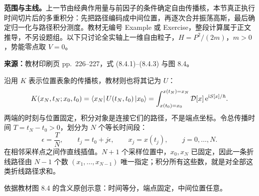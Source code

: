 \textbf{范围与主线。}上一节由经典作用量与前因子的条件确定自由传播核，本节真正执行时间切片后的多重积分：先把路径编码成中间位置，再逐次合并振荡高斯，最后确定归一化与路径积分测度。教材无编号 Example 或 Exercise，整段计算属于正文推导，不另设题组。以下只讨论全实轴上一维自由粒子，$H=P^2/(2m)$，$m>0$，势能零点取 $V=0$。

\textbf{来源：}教材印刷页 pp.~226--227，式 (8.4.1)--(8.4.3) 与图 8.4。

沿用 $K$ 表示位置表象的传播核，教材则也将其记为 $U$：
\begin{equation}
  K(x_N,t_N;x_0,t_0)=\left\langle x_N\right|U(t_N,t_0)\left|x_0\right\rangle
  =\int_{x(t_0)=x_0}^{x(t_N)=x_N}\mathcal D[x]\,
    \mathrm{e}^{\mathrm{i} S[x]/\hbar}.
\end{equation}
两端的时刻与位置固定，积分对象是连接它们的路径，不是端点坐标。令总传播时间 $T=t_N-t_0>0$，划分为 $N$ 个等长时间段：
\begin{equation}
  \epsilon=\frac TN,\qquad t_j=t_0+j\epsilon,\qquad
  x_j=x(t_j),\qquad j=0,\ldots,N.
\end{equation}
在相邻采样点之间作直线插值。$N+1$ 个采样位置中，$x_0,x_N$ 已固定，因此一条折线路径由 $N-1$ 个数 $(x_1,\ldots,x_{N-1})$ 唯一指定；积分所有这些数，就是对全部这类折线路径求和。

\begin{center}
\begin{minipage}{\linewidth}
\centering
{}

\small 依据教材图 8.4 的含义原创示意：时间等分，端点固定，中间位置任意。
\end{minipage}
\end{center}

